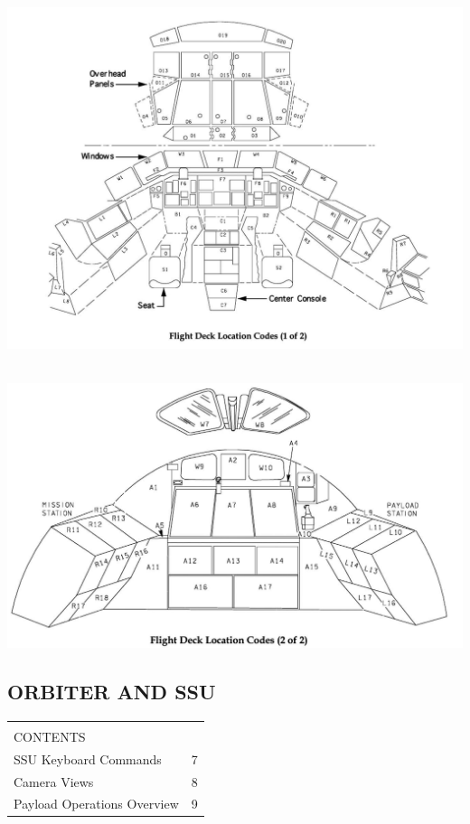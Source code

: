 \documentclass[13pt, letter,final]{article}
\begin{document}
\includegraphics[width=1\textwidth]{Flight_Deck_Loc_Codes_1.jpg}

\\


\includegraphics[width=1\textwidth]{Flight_Deck_Loc_Codes_2.jpg}

\vfill

\newpage
\subsection{\large ORBITER AND SSU}

\begin{tabular}{|p{7cm} p{0.25cm}|}
	\hline
	&\\[0.1cm]
	CONTENTS & \\[0.4cm]
	SSU Keyboard Commands & 7\\
	Camera Views & 8\\
	Payload Operations Overview & 9\\
	\hline
\end{tabular}
\end{document}
